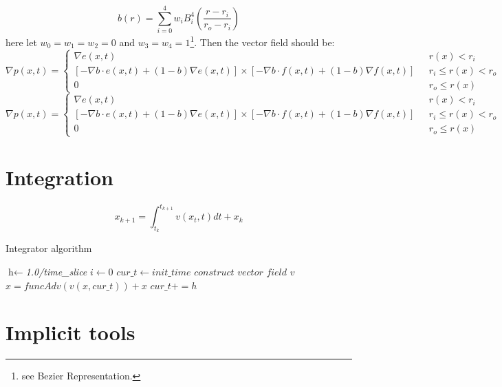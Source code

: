 \documentclass{article}
\theoremstyle{definition}
\theoremstyle{remark}
\begin{document}
\begin{equation}
  b(r) = \sum\limits_{i=0}^4 w_i B_i^4(\frac{r-r_i}{r_o-r_i})
\end{equation}
here let $w_0 = w_1 = w_2 = 0$ and $w_3 = w_4 = 1$\footnote{\noindent see Bezier Representation.}.
Then the vector field should be:
\begin{equation}
 \nabla p(x,t) = \begin{cases} \nabla e(x,t) & \mbox{ } r(x) <r_i\\
   [-\nabla b \cdot e(x,t) + (1-b) \nabla e(x,t)] \times [-\nabla b \cdot f(x,t) + (1-b) \nabla f(x,t)] & \mbox{ } r_i \le r(x) < r_o\\
   0 & \mbox{ } r_o \le r(x) \end{cases}
\end{equation}
\begin{equation}
 \nabla p(x,t) = \begin{cases} \nabla e(x,t) & \mbox{ } r(x) <r_i\\
   [-\nabla b \cdot e(x,t) + (1-b) \nabla e(x,t)] \times [-\nabla b \cdot f(x,t) + (1-b) \nabla f(x,t)] & \mbox{ } r_i \le r(x) < r_o\\
   0 & \mbox{ } r_o \le r(x) \end{cases}
\end{equation}

\section{Integration}
\begin{equation}
  x_{k+1} = \int_{t_k}^{t_{k+1}} v(x_t, t) dt + x_k
\end{equation}

\begin{algorithm}
\caption{Integrator algorithm}\label{euclid}
\begin{algorithmic}
\State $\textit{h} \gets $\textit{1.0/time\_slice}
\State $i \gets \textit{0}$
\State $cur\_t \gets \textit{init\_time}$
\EndProcedure
 \State $\textit{construct vector field v}$
 \State$x = funcAdv(v(x,cur\_t)) + x$
 \State$cur\_t += h$
\EndFor
\end{algorithmic}
\end{algorithm}

\section{Implicit tools}
\end{document}
